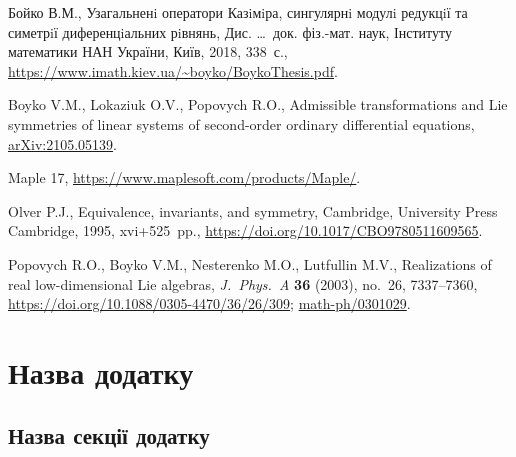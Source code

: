 \documentclass{thesis}
\begin{document}
\begin{thebibliography}{99}
\itemsep=0pt

Бойко В.М.,
Узагальненi оператори Казiмiра,
сингулярнi модулi редукцiї
та симетрiї диференцiальних рiвнянь,
Дис. \dots\ док. фіз.-мат. наук,  Інституту математики НАН України, Київ, 2018, 338~с., \url{https://www.imath.kiev.ua/~boyko/BoykoThesis.pdf}.



Boyko V.M., Lokaziuk O.V., Popovych R.O.,
Admissible transformations and Lie symmetries of linear systems of second-order ordinary differential equations, \href{https://arxiv.org/abs/2105.05139}{arXiv:2105.05139}.

Maple 17, \url{https://www.maplesoft.com/products/Maple/}.


Olver P.J., Equivalence, invariants, and symmetry, Cambridge, University Press Cambridge, 1995, xvi+525~pp.,
\url{https://doi.org/10.1017/CBO9780511609565}.


Popovych R.O., Boyko V.M., Nesterenko M.O., Lutfullin M.V., Realizations of real low-dimensional Lie algebras, \textit{J.~Phys.~A} \textbf{36} (2003), no.~26,
7337--7360, \url{https://doi.org/10.1088/0305-4470/36/26/309}; \href{https://arxiv.org/abs/math-ph/0301029}{math-ph/0301029}.



\end{thebibliography}

\appendix

\chapter{Назва додатку}\label{appendix1}

\section{Назва секції додатку}\label{appendix1.1}
\end{document}
